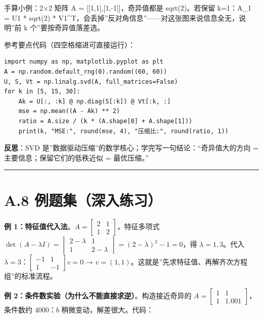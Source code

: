 手算小例：2×2 矩阵 A = {[}{[}1,1{]},{[}1,-1{]}{]}，奇异值都是
sqrt(2)。若保留 k=1：A\_1 = U1 * sqrt(2) *
V1\^{}T，会丢掉''反对角信息''------对这张图来说信息全无，说明''前 k
个''要按奇异值落差选。

参考要点代码（四空格缩进可直接运行）：

\begin{verbatim}
import numpy as np, matplotlib.pyplot as plt
A = np.random.default_rng(0).random((60, 60))
U, S, Vt = np.linalg.svd(A, full_matrices=False)
for k in [5, 15, 30]:
    Ak = U[:, :k] @ np.diag(S[:k]) @ Vt[:k, :]
    mse = np.mean((A - Ak) ** 2)
    ratio = A.size / (k * (A.shape[0] + A.shape[1]))
    print(k, "MSE:", round(mse, 4), "压缩比:", round(ratio, 1))
\end{verbatim}

\textbf{反思}：SVD
是''数据驱动压缩''的数学核心；学完写一句结论：``奇异值大的方向 =
主要信息；保留它们的低秩近似 = 最优压缩。''

\begin{center}\rule{0.5\linewidth}{0.5pt}\end{center}

\section{A.8
例题集（深入练习）}\label{a.8-ux4f8bux9898ux96c6ux6df1ux5165ux7ec3ux4e60}

\textbf{例
1：特征值代入法}。\(A=\begin{bmatrix}2&1\\1&2\end{bmatrix}\)，特征多项式
\(\det(A-\lambda I)=\begin{vmatrix}2-\lambda&1\\1&2-\lambda\end{vmatrix}=(2-\lambda)^2-1=0\)，得
\(\lambda=1,3\)。代入
\(\lambda=3\)：\(\begin{bmatrix}-1&1\\1&-1\end{bmatrix}v=0\) →
\(v=(1,1)\)。这就是''先求特征值、再解齐次方程组''的标准流程。

\textbf{例 2：条件数实验（为什么不能直接求逆）}。构造接近奇异的
\(A=\begin{bmatrix}1&1\\1&1.001\end{bmatrix}\)，条件数约 \(4000\)：\(b\)
稍微变动，解差很大。代码：

